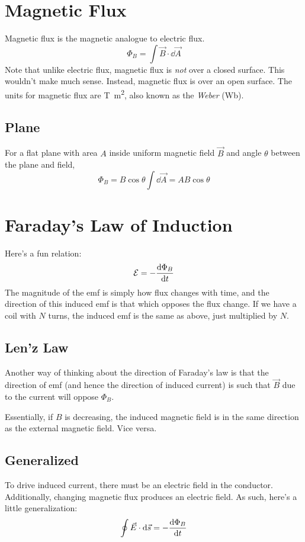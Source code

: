 \documentclass[]{article}
\begin{document}
\section{Magnetic Flux}
Magnetic flux is the magnetic analogue to electric flux.
\[ \Phi_B = \int \vec{B} \cdot \dd \vec{A} \]
Note that unlike electric flux, magnetic flux is \emph{not} over a closed surface. This wouldn't make much sense. Instead, magnetic flux is over an open surface. The units for magnetic flux are \unit{\tesla\meter\squared}, also known as the \emph{Weber} (\unit{\weber}).

\subsection{Plane}
For a flat plane with area $ A $ inside uniform magnetic field $ \vec{B} $ and angle $ \theta $ between the plane and field,
\[ \Phi_B = B \cos \theta \int \dd \vec{A} = AB\cos \theta \]

\section{Faraday's Law of Induction}
Here's a fun relation:
\[ \mathcal{E} = - \dv{\Phi_B}{t} \]
The magnitude of the emf is simply how flux changes with time, and the direction of this induced emf is that which opposes the flux change. If we have a coil with $ N $ turns, the induced emf is the same as above, just multiplied by $ N $.

\subsection{Len'z Law}
Another way of thinking about the direction of Faraday's law is that the direction of emf (and hence the direction of induced current) is such that $ \vec{B} $ due to the current will oppose $ \Phi_B $.

Essentially, if $ B $ is decreasing, the induced magnetic field is in the same direction as the external magnetic field. Vice versa.

\subsection{Generalized}
To drive induced current, there must be an electric field in the conductor. Additionally, changing magnetic flux produces an electric field. As such, here's a little generalization:
\[ \oint \vec{E} \cdot \dd \vec{s} = - \dv{\Phi_B}{t} \]
\end{document}
